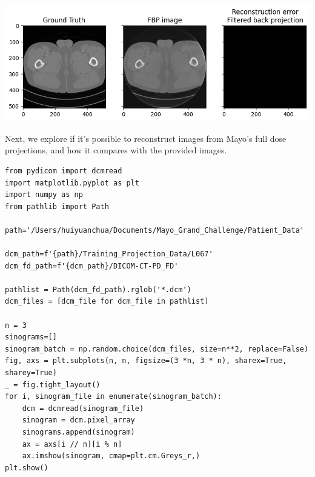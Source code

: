 \documentclass[a4paper, 11pt]{article}
\begin{document}
\begin{center}
\includegraphics[width=.9\linewidth]{./.ob-jupyter/4f489d264b4894c343ef9b893c5dcef90888ef35.png}
\end{center}

Next, we explore if it's possible to reconstruct images from Mayo's full dose projections, and how it compares with the provided images.
\begin{verbatim}
from pydicom import dcmread
import matplotlib.pyplot as plt
import numpy as np
from pathlib import Path

path='/Users/huiyuanchua/Documents/Mayo_Grand_Challenge/Patient_Data'

dcm_path=f'{path}/Training_Projection_Data/L067'
dcm_fd_path=f'{dcm_path}/DICOM-CT-PD_FD'

pathlist = Path(dcm_fd_path).rglob('*.dcm')
dcm_files = [dcm_file for dcm_file in pathlist]

n = 3
sinograms=[]
sinogram_batch = np.random.choice(dcm_files, size=n**2, replace=False)
fig, axs = plt.subplots(n, n, figsize=(3 *n, 3 * n), sharex=True, sharey=True)
_ = fig.tight_layout()
for i, sinogram_file in enumerate(sinogram_batch):
    dcm = dcmread(sinogram_file)
    sinogram = dcm.pixel_array
    sinograms.append(sinogram)
    ax = axs[i // n][i % n]
    ax.imshow(sinogram, cmap=plt.cm.Greys_r,)
plt.show()
\end{verbatim}
\end{document}
